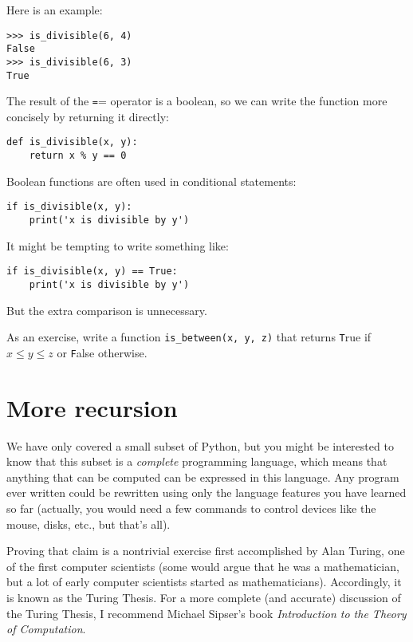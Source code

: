 \documentclass[
DIV=11,
fontsize=13,
twoside,
headinclude=false,
titlepage=firstiscover,
abstract=true,
headsepline=true,
footsepline=true,
chapterprefix=true, %
headings=big,
bibliography=totoc,%
captions=tableheading
]{scrbook}
\theoremstyle{definition}
\begin{document}
Here is an example:

\begin{lstlisting}
>>> is_divisible(6, 4)
False
>>> is_divisible(6, 3)
True
\end{lstlisting}
%
The result of the {\texttt ==} operator is a boolean, so we can write the
function more concisely by returning it directly:

\begin{lstlisting}
def is_divisible(x, y):
    return x % y == 0
\end{lstlisting}
%
Boolean functions are often used in conditional statements:

\begin{lstlisting}
if is_divisible(x, y):
    print('x is divisible by y')
\end{lstlisting}
%
It might be tempting to write something like:

\begin{lstlisting}
if is_divisible(x, y) == True:
    print('x is divisible by y')
\end{lstlisting}
%
But the extra comparison is unnecessary.

As an exercise, write a function \verb"is_between(x, y, z)" that
returns {\texttt True} if $x \le y \le z$ or {\texttt False} otherwise.


\section{More recursion}
\label{more.recursion}

We have only covered a small subset of Python, but you might
be interested to know that this subset is a {\em complete}
programming language, which means that anything that can be
computed can be expressed in this language.  Any program ever written
could be rewritten using only the language features you have learned
so far (actually, you would need a few commands to control devices
like the mouse, disks, etc., but that's all).

Proving that claim is a nontrivial exercise first accomplished by Alan
Turing, one of the first computer scientists (some would argue that he
was a mathematician, but a lot of early computer scientists started as
mathematicians).  Accordingly, it is known as the Turing Thesis.
For a more complete (and accurate) discussion of the Turing Thesis,
I recommend Michael Sipser's book {\em Introduction to the
Theory of Computation}.
\end{document}

